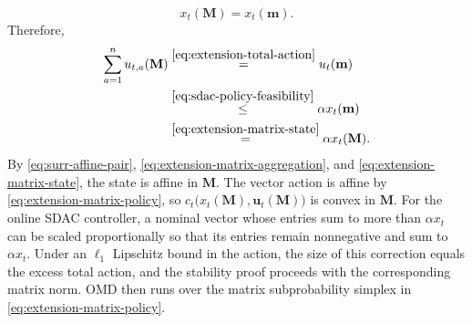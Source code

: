 \documentclass[journal]{IEEEtran}
\theoremstyle{remark}
\begin{document}
\begin{equation}
\label{eq:extension-matrix-state}
x_t(\mathbf{M})=x_t(\mathbf{m}).
\end{equation}
Therefore,
\[
\begin{aligned}
\sum_{a=1}^n u_{t,a}(\mathbf{M})
&\overset{\eqref{eq:extension-total-action}}{=}u_t(\mathbf{m})\\
&\overset{\eqref{eq:sdac-policy-feasibility}}{\le}\alpha x_t(\mathbf{m})\\
&\overset{\eqref{eq:extension-matrix-state}}{=}\alpha x_t(\mathbf{M}).
\end{aligned}
\]
By \eqref{eq:surr-affine-pair}, \eqref{eq:extension-matrix-aggregation},
and \eqref{eq:extension-matrix-state}, the state is affine in $\mathbf{M}$.
The vector action is affine by \eqref{eq:extension-matrix-policy}, so
$c_t\bigl(x_t(\mathbf{M}),\mathbf{u}_t(\mathbf{M})\bigr)$ is convex in $\mathbf{M}$. For the
online SDAC controller, a nominal vector whose entries sum to more than
$\alpha x_t$ can be scaled proportionally so that its entries remain nonnegative
and sum to $\alpha x_t$. Under an $\ell_1$ Lipschitz bound in the action, the size of this
correction equals the excess total action, and the stability proof proceeds with
the corresponding matrix norm. OMD then runs over the matrix subprobability
simplex in \eqref{eq:extension-matrix-policy}.
\end{document}
